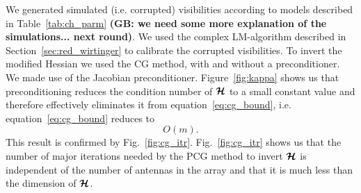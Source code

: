 \documentclass[useAMS,usenatbib]{mn2e}
\newcommand{\bmH}{\bmath{\mathcal{H}}}
\begin{document}
We generated simulated (i.e. corrupted) visibilities according to models described in Table~\ref{tab:ch_parm} {\bf (GB: we need some more explanation of the simulations... next round)}. 
%
We used the complex LM-algorithm described in Section~\ref{sec:red_wirtinger} to calibrate the corrupted visibilities. To invert the modified
Hessian we used the CG method, with and without a preconditioner. We made use of the Jacobian preconditioner. 
Figure~\ref{fig:kappa} shows us that preconditioning reduces the condition number of $\bmH$ to a small constant value and therefore effectively eliminates
it from equation~\ref{eq:cg_bound}, i.e. equation~\ref{eq:cg_bound} reduces to
\begin{equation}
\label{eq:cg_bound2}
O(m). 
\end{equation}
This result is confirmed by Fig.~\ref{fig:cg_itr}. Fig.~\ref{fig:cg_itr} 
shows us that the number of major iterations needed by the PCG method to invert 
$\bmH$ is independent of the number of antennas in the array and that it is much less than the 
dimension of $\bmH$. 
\end{document}
